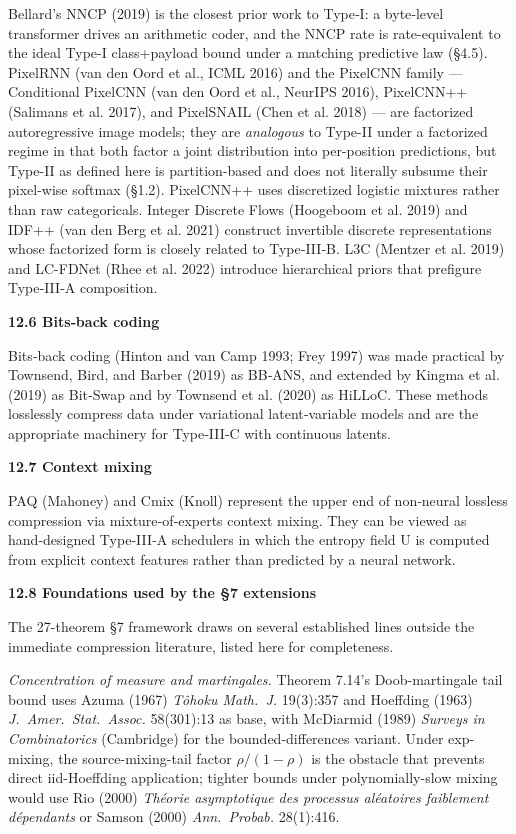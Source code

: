 \documentclass[
]{article}
\begin{document}
Bellard's NNCP (2019) is the closest prior work to Type‑I: a byte‑level
transformer drives an arithmetic coder, and the NNCP rate is
rate-equivalent to the ideal Type-I class+payload bound under a
matching predictive law (§4.5). PixelRNN (van den Oord et al.,
ICML 2016) and the PixelCNN family --- Conditional PixelCNN (van den
Oord et al., NeurIPS 2016), PixelCNN++ (Salimans et al. 2017), and
PixelSNAIL (Chen et al. 2018) --- are factorized autoregressive
image models; they are \emph{analogous} to Type-II under a
factorized regime in that both factor a joint distribution into
per-position predictions, but Type-II as defined here is
partition-based and does not literally subsume their pixel-wise
softmax (§1.2). PixelCNN++ uses discretized logistic mixtures
rather than raw categoricals. Integer Discrete
Flows (Hoogeboom et al. 2019) and IDF++ (van den Berg et al. 2021)
construct invertible discrete representations whose factorized form is
closely related to Type‑III‑B. L3C (Mentzer et al. 2019) and LC-FDNet
(Rhee et al. 2022) introduce hierarchical priors that prefigure
Type‑III‑A composition.

\textbf{12.6 Bits‑back coding}

Bits‑back coding (Hinton and van Camp 1993; Frey 1997) was made
practical by Townsend, Bird, and Barber (2019) as BB‑ANS, and extended
by Kingma et al. (2019) as Bit‑Swap and by Townsend et al. (2020) as
HiLLoC. These methods losslessly compress data under variational
latent‑variable models and are the appropriate machinery for Type‑III‑C
with continuous latents.

\textbf{12.7 Context mixing}

PAQ (Mahoney) and Cmix (Knoll) represent the upper end of non‑neural
lossless compression via mixture‑of‑experts context mixing. They can be
viewed as hand‑designed Type‑III‑A schedulers in which the entropy field
U is computed from explicit context features rather than predicted by a
neural network.

\textbf{12.8 Foundations used by the §7 extensions}

The 27-theorem §7 framework draws on several established lines outside
the immediate compression literature, listed here for completeness.

\emph{Concentration of measure and martingales.} Theorem 7.14's
Doob-martingale tail bound uses Azuma (1967) \emph{T\^ohoku Math.\
J.} 19(3):357 and Hoeffding (1963) \emph{J.\ Amer.\ Stat.\ Assoc.}
58(301):13 as base, with McDiarmid (1989) \emph{Surveys in
Combinatorics} (Cambridge) for the bounded-differences variant.
Under exp-mixing, the source-mixing-tail factor $\rho/(1-\rho)$ is
the obstacle that prevents direct iid-Hoeffding application; tighter
bounds under polynomially-slow mixing would use Rio (2000)
\emph{Th\'eorie asymptotique des processus al\'eatoires faiblement
d\'ependants} or Samson (2000) \emph{Ann.\ Probab.} 28(1):416.
\end{document}
